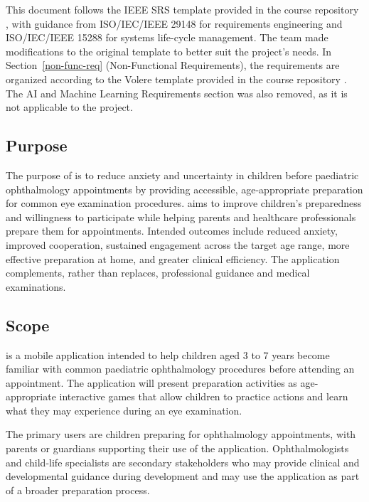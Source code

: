 \documentclass[12pt]{article}
\begin{document}
This document follows the IEEE SRS template provided in the course repository \cite{SmithCapTemplate},
with guidance from ISO/IEC/IEEE 29148 \cite{ISOIECIEEE291482018} for requirements engineering and
ISO/IEC/IEEE 15288 \cite{ISOIECIEEE152882023} for systems life-cycle management. The team made
modifications to the original template to better suit the project's needs. In Section~\ref{non-func-req}
(Non-Functional Requirements), the requirements are organized according to the Volere template provided
in the course repository \cite{SmithCapTemplate}. The AI and Machine Learning Requirements section was
also removed, as it is not applicable to the project.

\subsection{Purpose}
\label{purpose}

The purpose of \progname{} is to reduce anxiety and uncertainty in children before paediatric
ophthalmology appointments by providing accessible, age-appropriate preparation for common eye
examination procedures. \progname{} aims to improve children's preparedness and willingness to participate while helping
parents and healthcare professionals prepare them for appointments. Intended outcomes include
reduced anxiety, improved cooperation, sustained engagement across the target age range,
more effective preparation at home, and greater clinical efficiency. The application complements,
rather than replaces, professional guidance and medical examinations.

\subsection{Scope}
\label{sec_Scope}

\progname{} is a mobile application intended to help children aged 3 to 7 years become familiar
with common paediatric ophthalmology procedures before attending an appointment. The application
will present preparation activities as age-appropriate interactive games that allow children to
practice actions and learn what they may experience during an eye examination.

The primary users are children preparing for ophthalmology appointments, with parents or guardians
supporting their use of the application. Ophthalmologists and child-life specialists are secondary
stakeholders who may provide clinical and developmental guidance during development and may use
the application as part of a broader preparation process.
\end{document}
